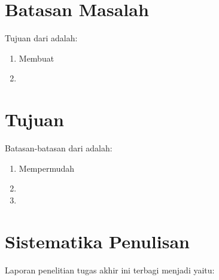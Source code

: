 \section{Batasan Masalah}
\label{sec:batasanmasalah}

Tujuan dari \lipsum[1][1-3] adalah:

\begin{enumerate}[nolistsep]

  \item Membuat \lipsum[2][1-3]

  \item \lipsum[3][1-3]

\end{enumerate}

\section{Tujuan}
\label{sec:Tujuan}

Batasan-batasan dari \lipsum[1][1-3] adalah:

\begin{enumerate}[nolistsep]

  \item Mempermudah \lipsum[2][1-3]

  \item \lipsum[3][1-5]

  \item \lipsum[4][1-5]

\end{enumerate}

\section{Sistematika Penulisan}
\label{sec:sistematikapenulisan}

Laporan penelitian tugas akhir ini terbagi menjadi \lipsum[1][1-3] yaitu:

